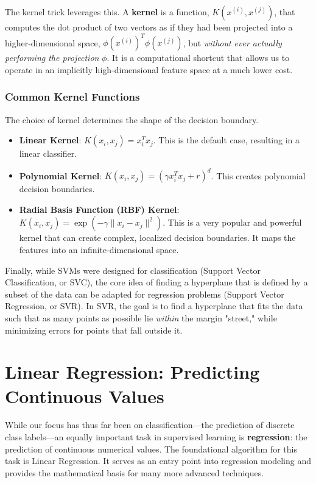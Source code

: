 The kernel trick leverages this. A \textbf{kernel} is a function, $K(x^{(i)}, x^{(j)})$, that computes the dot product of two vectors as if they had been projected into a higher-dimensional space, $\phi(x^{(i)})^T \phi(x^{(j)})$, but \textit{without ever actually performing the projection} $\phi$. It is a computational shortcut that allows us to operate in an implicitly high-dimensional feature space at a much lower cost.

\subsubsection*{Common Kernel Functions}
The choice of kernel determines the shape of the decision boundary.
\begin{itemize}
    \item \textbf{Linear Kernel}: $K(x_i, x_j) = x_i^T x_j$. This is the default case, resulting in a linear classifier.
    \item \textbf{Polynomial Kernel}: $K(x_i, x_j) = (\gamma x_i^T x_j + r)^d$. This creates polynomial decision boundaries.
    \item \textbf{Radial Basis Function (RBF) Kernel}: $K(x_i, x_j) = \exp(-\gamma \|x_i - x_j\|^2)$. This is a very popular and powerful kernel that can create complex, localized decision boundaries. It maps the features into an infinite-dimensional space.
\end{itemize}

Finally, while SVMs were designed for classification (Support Vector Classification, or SVC), the core idea of finding a hyperplane that is defined by a subset of the data can be adapted for regression problems (Support Vector Regression, or SVR). In SVR, the goal is to find a hyperplane that fits the data such that as many points as possible lie \textit{within} the margin "street," while minimizing errors for points that fall outside it.

\section{Linear Regression: Predicting Continuous Values}
\label{sec:linear_regression}
While our focus has thus far been on classification—the prediction of discrete class labels—an equally important task in supervised learning is \textbf{regression}: the prediction of continuous numerical values. The foundational algorithm for this task is Linear Regression. It serves as an entry point into regression modeling and provides the mathematical basis for many more advanced techniques.

